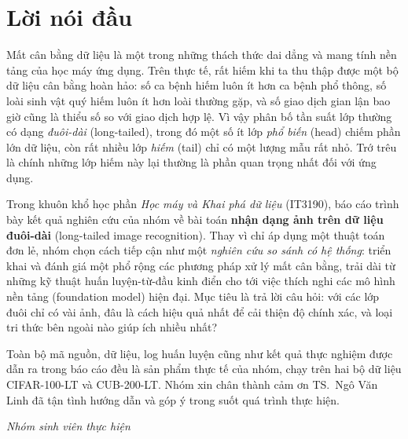 \chapter*{Lời nói đầu}

Mất cân bằng dữ liệu là một trong những thách thức dai dẳng và mang tính nền tảng của học máy ứng
dụng. Trên thực tế, rất hiếm khi ta thu thập được một bộ dữ liệu cân bằng hoàn hảo: số ca bệnh hiếm
luôn ít hơn ca bệnh phổ thông, số loài sinh vật quý hiếm luôn ít hơn loài thường gặp, và số giao
dịch gian lận bao giờ cũng là thiểu số so với giao dịch hợp lệ. Vì vậy phân bố tần suất lớp thường
có dạng \emph{đuôi-dài} (long-tailed), trong đó một số ít lớp \emph{phổ biến} (head) chiếm phần lớn
dữ liệu, còn rất nhiều lớp \emph{hiếm} (tail) chỉ có một lượng mẫu rất nhỏ. Trớ trêu là chính những
lớp hiếm này lại thường là phần quan trọng nhất đối với ứng dụng.

Trong khuôn khổ học phần \emph{Học máy và Khai phá dữ liệu} (IT3190), báo cáo trình bày kết quả
nghiên cứu của nhóm về bài toán \textbf{nhận dạng ảnh trên dữ liệu đuôi-dài} (long-tailed image
recognition). Thay vì chỉ áp dụng một thuật toán đơn lẻ, nhóm chọn cách tiếp cận như một
\emph{nghiên cứu so sánh có hệ thống}: triển khai và đánh giá một phổ rộng các phương pháp xử lý mất
cân bằng, trải dài từ những kỹ thuật huấn luyện-từ-đầu kinh điển cho tới việc thích nghi các mô hình
nền tảng (foundation model) hiện đại. Mục tiêu là trả lời câu hỏi: với các lớp đuôi chỉ có vài ảnh,
đâu là cách hiệu quả nhất để cải thiện độ chính xác, và loại tri thức bên ngoài nào giúp ích nhiều
nhất?

Toàn bộ mã nguồn, dữ liệu, log huấn luyện cũng như kết quả thực nghiệm được dẫn ra trong báo cáo đều
là sản phẩm thực tế của nhóm, chạy trên hai bộ dữ liệu CIFAR-100-LT và CUB-200-LT. Nhóm xin chân
thành cảm ơn TS.~Ngô Văn Linh đã tận tình hướng dẫn và góp ý trong suốt quá trình thực hiện.

\vspace{0.5cm}
\begin{flushright}
\textit{Nhóm sinh viên thực hiện}
\end{flushright}
